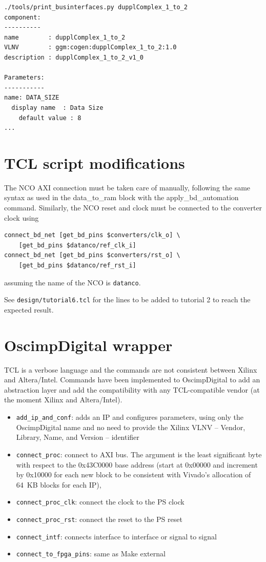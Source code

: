 \documentclass[12pt,oneside]{article}
\begin{document}
{\footnotesize
\begin{verbatim}
./tools/print_businterfaces.py dupplComplex_1_to_2
component:
----------
name        : dupplComplex_1_to_2
VLNV        : ggm:cogen:dupplComplex_1_to_2:1.0
description : dupplComplex_1_to_2_v1_0

Parameters:
-----------
name: DATA_SIZE
  display name  : Data Size
    default value : 8
...
\end{verbatim}
}

\section{TCL script modifications}

The NCO AXI connection must be taken care of manually, following the same syntax as used in the data\_to\_ram block
with the apply\_bd\_automation command. Similarly, the NCO reset and clock must be connected to the converter clock
using 
{\footnotesize
\begin{verbatim}
connect_bd_net [get_bd_pins $converters/clk_o] \
	[get_bd_pins $datanco/ref_clk_i]
connect_bd_net [get_bd_pins $converters/rst_o] \
	[get_bd_pins $datanco/ref_rst_i]
\end{verbatim}
}
\noindent assuming the name of the NCO is {\tt datanco}.

See {\tt design/tutorial6.tcl} for the lines to be added to tutorial 2 to reach the expected result.

\section{OscimpDigital wrapper}

TCL is a verbose language and the commands are not consistent between Xilinx and Altera/Intel. Commands have
been implemented to OscimpDigital to add an abstraction layer and add the compatibility with any TCL-compatible
vendor (at the moment Xilinx and Altera/Intel).

\begin{itemize}
\item
{\tt add\_ip\_and\_conf}: adds an IP and configures parameters, using only the OscimpDigital name and no need to 
		provide the Xilinx VLNV -- Vendor, Library, Name, and Version -- identifier
\item {\tt connect\_proc}: connect to AXI bus. The argument is the least significant byte with respect to the 0x43C0000 base
address (start at 0x00000 and increment by 0x10000 for each new block to be consistent with Vivado's allocation of 64~KB blocks
for each IP),
\item {\tt connect\_proc\_clk}: connect the clock to the PS clock
\item {\tt connect\_proc\_rst}: connect the reset to the PS reset
\item {\tt connect\_intf}: connects interface to interface or signal to signal
\item {\tt connect\_to\_fpga\_pins}: same as Make external
\end{itemize}
\end{document}
